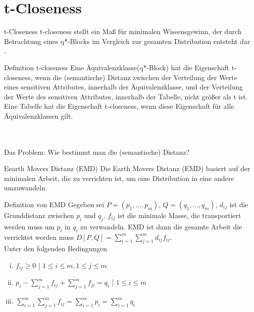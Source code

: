 \section{t-Closeness}

\begin{frame}{t-Closeness}
	t-closeness stellt ein Maß für minimalen Wissensgewinn, der durch Betrachtung eines q*-Blocks im Vergleich zur gesamten Distribution entsteht dar \cite{kltHauf}.
	\begin{block}{Definition t-closeness}
		Eine Äquivalenzklasse(q*-Block) hat die Eigenschaft t-closeness, wenn die (semantische) Distanz zwischen der Verteilung der Werte eines sensitiven Attributes, innerhalb der Äquivalenzklasse, und der Verteilung der Werte des sensitiven Attributes, innerhalb der Tabelle, nicht größer als t ist. Eine Tabelle hat die Eigenschaft t-closeness, wenn diese Eigenschaft für alle Äquivalenzklassen gilt.	
	\end{block}
	\ \\
	\ \\ 
	Das Problem: Wie bestimmt man die (semantische) Distanz?
\end{frame}

\begin{frame}{Eearth Movers Distanz (EMD)}
	Die Earth Movers Distanz (EMD)  basiert auf der minimalen Arbeit, die zu verrichten ist, um eine Distribution in eine andere umzuwandeln.
	\begin{block}{Definition von EMD \cite{Li2007t-closseness}}
		Gegeben sei $P=(p_1,...,p_m)$, $Q=(q_1,...,q_m)$, $d_{ij}$ ist die Grunddistanz zwischen $p_i$ und $q_j$. $f_{ij}$ ist die minimale Masse, die transportiert werden muss um $p_i$ in $q_i$ zu verwandeln. EMD ist dann die gesamte Arbeit die verrichtet werden muss $D[P,Q] = \sum_{i=1}^m \sum_{j=1}^m d_{ij} f_{ij}$.\\
		Unter den folgenden Bedingungen
		\begin{enumerate}[i)]
			\item $f_{ij}\ge 0$ | $1\le i \le m, 1\le j \le m$		
			\item $p_i - \sum_{j=1}^{m}f_{ij} +\sum_{j=1}^{m}f_{ji} = q_i$ | $1 \le i \le m$
			\item $\sum_{i=1}^{m}\sum_{j=1}^{m} f_{ij} = \sum_{i=1}^{m} p_i = \sum_{i=1}^{m} q_i$ 
		\end{enumerate}
	\end{block}
\end{frame}
